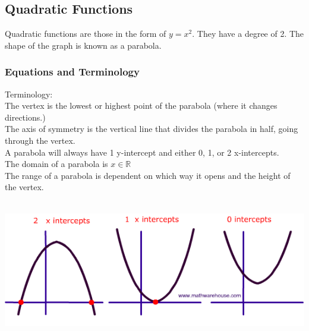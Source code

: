 \subsection{Quadratic Functions}
Quadratic functions are those in the form of $y=x^2$. They have a degree of 2. The shape of the graph is known as a parabola.

\subsubsection{Equations and Terminology}
Terminology:\\
The vertex is the lowest or highest point of the parabola (where it changes directions.)\\
The axis of symmetry is the vertical line that divides the parabola in half, going through the vertex.\\
A parabola will always have 1 y-intercept and either 0, 1, or 2 x-intercepts.\\
The domain of a parabola is $x\in\mathbb{R}$\\
The range of a parabola is dependent on which way it opens and the height of the vertex.\\
\\
\centerline{\includegraphics[scale = 0.6]{Images/PreCalcPictures/ParabolaSolutions.png}}

